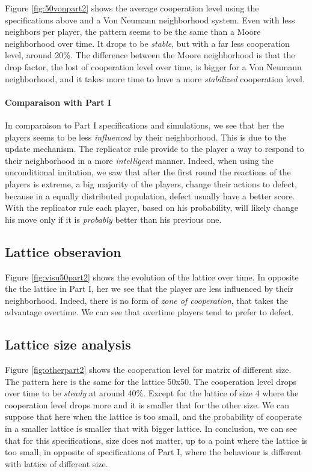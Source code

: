 \documentclass[letterpaper]{article}
\begin{document}
Figure \ref{fig:50vonpart2} shows the average cooperation level using
the specifications above and a Von Neumann neighborhood system. Even
with less neighbors per player, the pattern seems to be the same
than a Moore neighborhood over time.
It drops to be \textit{stable},
but with a far less cooperation level, around 20\%.
The difference between the Moore neighborhood is that the drop factor,
the lost of cooperation level over time, is bigger for a Von Neumann
neighborhood, and it takes more time to have a more \textit{stabilized}
cooperation level.

\paragraph{Comparaison with Part I}

In comparaison to Part I specifications and simulations, we see that her
the players seems to be less \textit{influenced} by their neighborhood.
This is due to the update mechanism. The replicator rule provide to the player
a way to respond to their neighborhood in a more \textit{intelligent} manner.
Indeed, when using the unconditional imitation, we saw that after the first
round the reactions of the players is extreme, a big majority of the players,
change their actions to defect, because in a equally distributed population,
defect usually have a better score. With the replicator rule each player,
based on his probability, will likely change his move only if it is
\textit{probably} better than his previous one.

\subsection{Lattice obseravion}

Figure \ref{fig:visu50part2} shows the evolution of the lattice over time.
In opposite the the lattice in Part I, her we see that the player are less
influenced by their neighborhood. Indeed, there is no form of
\textit{zone of cooperation}, that takes the advantage overtime.
We can see that overtime players tend to prefer to defect.

\subsection{Lattice size analysis}

Figure \ref{fig:otherpart2} shows the cooperation level for matrix of
different size. The pattern here is the same for the lattice 50x50. The
cooperation level drops over time to be \textit{steady} at around 40\%.
Except for the lattice of size 4 where the cooperation level drops more and
it is smaller that for the other size. We can suppose that here when the
lattice is too small, and the probability of cooperate in a smaller lattice
is smaller that with bigger lattice. In conclusion, we can see that for
this specifications,
size does not matter, up to a point where the lattice is too small,
in opposite of specifications of Part I, where the behaviour is different
with lattice of different size.
\end{document}
